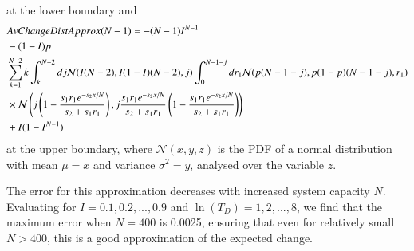 at the lower boundary and 
\begin{align}
& AvChangeDistApprox(N-1)=-(N-1)I^{N-1}\\
& - (1-I)p \notag \\
& \sum_{k=1}^{N-2}k \int_k^{N-2}dj \mathcal{N}(I(N-2),I(1-I)(N-2),j)\int_0^{N-1-j}dr_1 \mathcal{N}(p(N-1-j),p(1-p)(N-1-j),r_1) \notag \\
& \times \mathcal{N}\left(j\left(1-\frac{s_1r_1 e^{-s_2x/N}}{s_2+s_1r_1}\right),j\frac{s_1r_1 e^{-s_2x/N}}{s_2+s_1r_1}\left(1-\frac{s_1r_1 e^{-s_2x/N}}{s_2+s_1r_1}\right)\right) \notag \\
&+I(1-I^{N-1})\notag \end{align}
at the upper boundary, where $\mathcal{N}(x,y,z)$ is the PDF of a normal distribution with mean $\mu=x$ and variance $\sigma^2=y$, analysed over the variable $z$.

The error for this approximation decreases with increased system capacity $N$. Evaluating for $I=0.1,0.2,...,0.9$ and $\ln(T_D)=1,2,...,8$, we find that the maximum error when $N=400$ is 0.0025, ensuring that even for relatively small $N>400$, this is a good approximation of the expected change.



\eappendix
